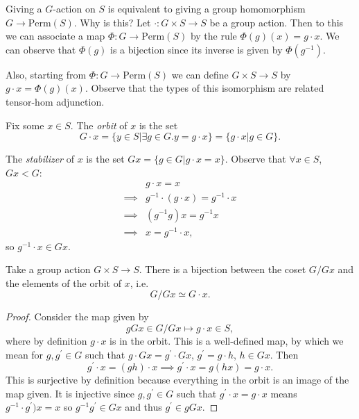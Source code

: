 \begin{remark}
Giving a $G$-action on $S$ is equivalent to giving a group
homomorphism $G \to \mathrm{Perm}(S)$. Why is this? Let
$\cdot : G \times S \to S$ be a group action. Then to this we can
associate a map $\Phi : G \to \mathrm{Perm}(S)$ by the rule
$\Phi(g)(x) = g \cdot x$. We can observe that $\Phi(g)$ is a bijection
since its inverse is given by $\Phi(g^{-1})$.

Also, starting from $\Phi : G \to \mathrm{Perm}(S)$ we can define
$G \times S \to S$ by $g \cdot x = \Phi(g)(x)$. Observe that the types
of this isomorphism are related tensor-hom adjunction.
\end{remark}

\begin{defn}
Fix some $x \in S$. The \emph{orbit} of $x$ is the set
$$
G \cdot x = \{ y \in S | \exists g \in G . y = g \cdot x \}
          = \{ g \cdot x | g \in G \}.
$$

The \emph{stabilizer} of $x$ is the set
$Gx = \{ g \in G | g \cdot x = x \}$. Observe that
$\forall x \in S$, $Gx < G$:
\begin{align*}
         & g \cdot x = x \\
\implies & g^{-1} \cdot (g \cdot x) = g^{-1} \cdot x \\
\implies & (g^{-1} g) x = g^{-1} x \\
\implies & x = g^{-1} \cdot x,
\end{align*}
so $g^{-1} \cdot x \in Gx$.
\end{defn}

\begin{prop}
Take a group action $G \times S \to S$. There is a bijection between
the coset $G / Gx$ and the elements of the orbit of $x$, i.e.
$$
G / Gx \simeq G \cdot x.
$$
\end{prop}
\begin{proof}
Consider the map given by
$$
gGx \in G / Gx \mapsto g \cdot x \in S,
$$
where by definition $g \cdot x$ is in the orbit. This is a
well-defined map, by which we mean for $g, g^\prime \in G$ such that
$g \cdot Gx = g^\prime \cdot Gx$, $g^\prime = g \cdot h$, $h \in
Gx$. Then
$$
g^\prime \cdot x = (g h) \cdot x
\implies g^\prime \cdot x = g(hx) = g \cdot x.
$$
This is surjective by definition because everything in the orbit is an
image of the map given. It is injective since $g, g^\prime \in G$ such
that $g^\prime \cdot x = g \cdot x$ means $g^{-1} \cdot g^\prime) x =
x$ so $g^{-1} g^\prime \in G x$ and thus $g^\prime \in g G x$.
\end{proof}

